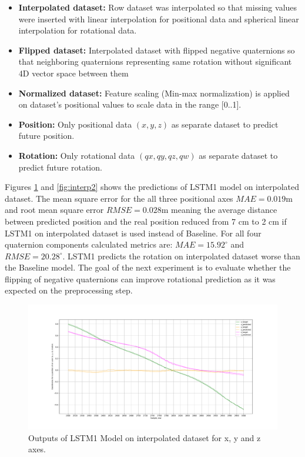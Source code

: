 \begin{itemize}
	\item \textbf{Interpolated dataset:} Row dataset was interpolated so that missing values were inserted with linear interpolation for positional data and spherical linear interpolation for rotational data. 
	\item \textbf{Flipped dataset:} Interpolated dataset with flipped negative quaternions so that neighboring quaternions representing same rotation without significant 4D vector space between them
	\item \textbf{Normalized dataset:} Feature scaling (Min-max normalization) is applied on dataset's positional values to scale data in the range [0..1]. 
	\item \textbf{Position:} Only positional data $(x, y, z)$ as separate dataset to predict future position. 
	\item \textbf{Rotation:} Only rotational data $(qx, qy, qz, qw)$ as separate dataset to predict future rotation. 
	
\end{itemize}



Figures \ref{fig:interp1} and \ref{fig:interp2} shows the predictions of LSTM1 model on interpolated dataset. The mean square error for the all three positional axes $MAE = 0.019$m and root mean square error  $RMSE = 0.028$m meaning the average distance between predicted position and the real position reduced from 7 cm to 2 cm if LSTM1 on interpolated dataset is used instead of Baseline. For all four quaternion components calculated metrics  are: $MAE = 15.92^{\circ}$ and $RMSE =20.28^{\circ}$. LSTM1 predicts the rotation on interpolated dataset worse than the Baseline model. The goal of the next experiment is to evaluate whether the flipping of negative quaternions can improve rotational prediction as it was expected on the preprocessing step.

\begin{figure}[htb]
	\begin{center}
		\includegraphics[width=1\textwidth, keepaspectratio]{gfx/lstm1_interpolated-xyz_position.pdf}
		\caption{\label{fig:interp1} Outputs of LSTM1 Model on interpolated dataset for x, y and z axes.}
	\end{center}
\end{figure}


